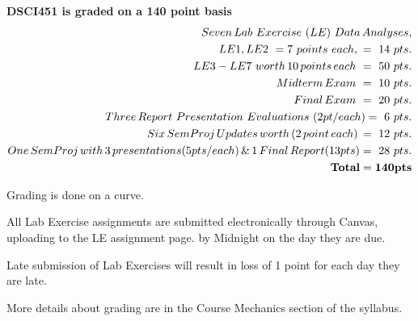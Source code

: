 \documentclass[10pt]{article} %
\begin{document}
{\bf DSCI451 is graded on a 140 point basis}
\begin{align*}
  Seven \, Lab \ Exercise \ (LE) \ Data \, Analyses, \\
  LE1,LE2 \ = 7 \ points \ each, \ = \ 14 \ pts.\\
  LE3-LE7 \ worth \, 10 \, points \, each \ = \ 50 \ pts.\\
  Midterm \, Exam \ = \ 10 \ pts.\\
  Final \, Exam \ = \ 20 \ pts. \\
  Three \, Report \ Presentation \ Evaluations \ (2 pt/each)  = \ 6 \ pts. \\
  Six \, SemProj \, Updates \, worth \, (2 \, point \, each) \, =  \ 12 \ pts. \\
  One \, SemProj \, with \,3 \, presentations (5 pts/each) \, \& \,1 \, Final \, Report (13 pts) = \ 28 \ pts. \\
  {\bf Total = 140 pts}
\end{align*}


Grading is done on a curve.

All Lab Exercise assignments are submitted electronically through Canvas, uploading to the LE assignment page. by Midnight on the day they are due.

Late submission of Lab Exercises will result in loss of 1 point for each day they are late.

More details about grading are in the Course Mechanics section of the syllabus.


\FloatBarrier
\end{document}
